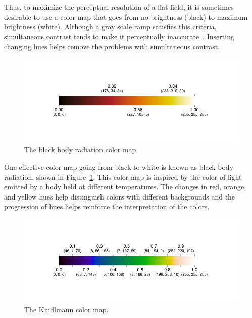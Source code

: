 \documentclass[letterpaper,twocolumn,fleqn]{article}
\newcommand*{\lcite}[1]{~\cite{#1}}
\begin{document}
Thus, to maximize the perceptual resolution of a flat field, it is
sometimes desirable to use a color map that goes from no brightness (black)
to maximum brightness (white). Although a gray scale ramp satisfies this
criteria, simultaneous contrast tends to make it perceptually
inaccurate\lcite{Ware2004}. Inserting changing hues helps remove the
problems with simultaneous contrast.

\begin{figure}[htb]
  \centering
  \includegraphics[width=\linewidth,trim=0.69in 0.62in 0.76in 0.62in]
                  {ipython/BlackBodyMap}
  \caption{The black body radiation color map.}
  \label{fig:BlackBodyRadiationColorBar}
\end{figure}

One effective color map going from black to white is known as black
body radiation, shown in Figure~\ref{fig:BlackBodyRadiationColorBar}. This
color map is inspired by the color of light emitted by a body held at
different temperatures. The changes in red, orange, and yellow hues help
distinguish colors with different backgrounds and the progression of hues
helps reinforce the interpretation of the colors.

\begin{figure}[htb]
  \centering
  \includegraphics[width=\linewidth,trim=0.69in 0.62in 0.76in 0.62in]
                  {ipython/KindlmannMap}
  \caption{The Kindlmann color map.}
  \label{fig:KindlmannColorBar}
\end{figure}
\end{document}
